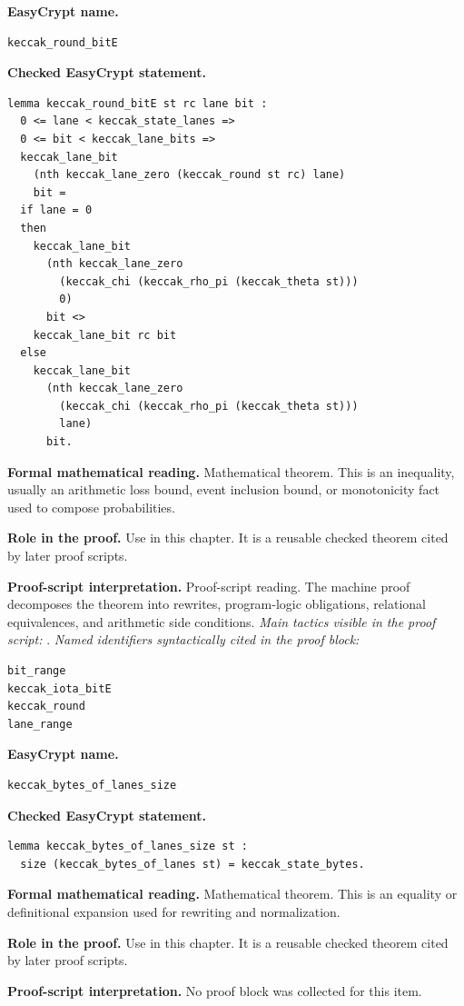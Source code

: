 \begin{formaltheorem}
\noindent\textbf{EasyCrypt name.}
\begin{lstlisting}[language=EasyCrypt,basicstyle=\ttfamily\scriptsize]
keccak_round_bitE
\end{lstlisting}
\noindent\textbf{Checked EasyCrypt statement.}
\begin{lstlisting}[language=EasyCrypt,basicstyle=\ttfamily\scriptsize]
lemma keccak_round_bitE st rc lane bit :
  0 <= lane < keccak_state_lanes =>
  0 <= bit < keccak_lane_bits =>
  keccak_lane_bit
    (nth keccak_lane_zero (keccak_round st rc) lane)
    bit =
  if lane = 0
  then
    keccak_lane_bit
      (nth keccak_lane_zero
        (keccak_chi (keccak_rho_pi (keccak_theta st)))
        0)
      bit <>
    keccak_lane_bit rc bit
  else
    keccak_lane_bit
      (nth keccak_lane_zero
        (keccak_chi (keccak_rho_pi (keccak_theta st)))
        lane)
      bit.
\end{lstlisting}
\noindent\textbf{Formal mathematical reading.}
Mathematical theorem. This is an inequality, usually an arithmetic loss bound, event inclusion bound, or monotonicity fact used to compose probabilities.

\noindent\textbf{Role in the proof.}
Use in this chapter. It is a reusable checked theorem cited by later proof scripts.

\noindent\textbf{Proof-script interpretation.}
Proof-script reading. The machine proof decomposes the theorem into rewrites, program-logic obligations, relational equivalences, and arithmetic side conditions.
\emph{Main tactics visible in the proof script:} .
\emph{Named identifiers syntactically cited in the proof block:}
\begin{lstlisting}[language=EasyCrypt,basicstyle=\ttfamily\scriptsize]
bit_range
keccak_iota_bitE
keccak_round
lane_range
\end{lstlisting}

\end{formaltheorem}

\begin{formaltheorem}
\noindent\textbf{EasyCrypt name.}
\begin{lstlisting}[language=EasyCrypt,basicstyle=\ttfamily\scriptsize]
keccak_bytes_of_lanes_size
\end{lstlisting}
\noindent\textbf{Checked EasyCrypt statement.}
\begin{lstlisting}[language=EasyCrypt,basicstyle=\ttfamily\scriptsize]
lemma keccak_bytes_of_lanes_size st :
  size (keccak_bytes_of_lanes st) = keccak_state_bytes.
\end{lstlisting}
\noindent\textbf{Formal mathematical reading.}
Mathematical theorem. This is an equality or definitional expansion used for rewriting and normalization.

\noindent\textbf{Role in the proof.}
Use in this chapter. It is a reusable checked theorem cited by later proof scripts.

\noindent\textbf{Proof-script interpretation.}
No proof block was collected for this item.

\end{formaltheorem}

